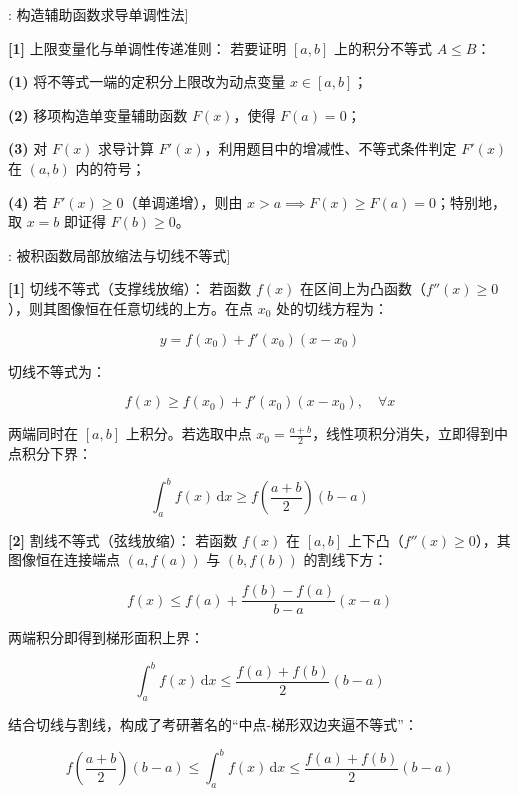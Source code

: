 \documentclass[11pt,a4paper,UTF8]{ctexart}
\begin{document}
\begin{thmbox}[方法[7]: 构造辅助函数求导单调性法]

\textbf{[1]} 上限变量化与单调性传递准则：
若要证明 $[a, b]$ 上的积分不等式 $A \leqslant B$：

\textbf{(1)}  将不等式一端的定积分上限改为动点变量 $x \in [a, b]$；

\textbf{(2)}  移项构造单变量辅助函数 $F(x)$，使得 $F(a) = 0$；

\textbf{(3)}  对 $F(x)$ 求导计算 $F'(x)$，利用题目中的增减性、不等式条件判定 $F'(x)$ 在 $(a, b)$ 内的符号；

\textbf{(4)}  若 $F'(x) \geqslant 0$（单调递增），则由 $x > a \implies F(x) \geqslant F(a) = 0$；特别地，取 $x = b$ 即证得 $F(b) \geqslant 0$。

\end{thmbox}
\begin{thmbox}[方法[8]: 被积函数局部放缩法与切线不等式]

\textbf{[1]} 切线不等式（支撑线放缩）：
若函数 $f(x)$ 在区间上为凸函数（$f''(x) \geqslant 0$），则其图像恒在任意切线的上方。在点 $x_0$ 处的切线方程为：


\begin{equation*}
y = f(x_0) + f'(x_0)(x-x_0)
\end{equation*}


切线不等式为：


\begin{equation*}
f(x) \geqslant f(x_0) + f'(x_0)(x-x_0), \quad \forall x
\end{equation*}


两端同时在 $[a, b]$ 上积分。若选取中点 $x_0 = \frac{a+b}{2}$，线性项积分消失，立即得到中点积分下界：


\begin{equation*}
\int_a^b f(x)\,\mathrm{d}x \geqslant f\left(\frac{a+b}{2}\right)(b-a)
\end{equation*}


\textbf{[2]} 割线不等式（弦线放缩）：
若函数 $f(x)$ 在 $[a, b]$ 上下凸（$f''(x) \geqslant 0$），其图像恒在连接端点 $(a, f(a))$ 与 $(b, f(b))$ 的割线下方：


\begin{equation*}
f(x) \leqslant f(a) + \frac{f(b)-f(a)}{b-a}(x-a)
\end{equation*}


两端积分即得到梯形面积上界：


\begin{equation*}
\int_a^b f(x)\,\mathrm{d}x \leqslant \frac{f(a)+f(b)}{2}(b-a)
\end{equation*}


结合切线与割线，构成了考研著名的“中点-梯形双边夹逼不等式”：


\begin{equation*}
f\left(\frac{a+b}{2}\right)(b-a) \leqslant \int_a^b f(x)\,\mathrm{d}x \leqslant \frac{f(a)+f(b)}{2}(b-a)
\end{equation*}


\end{thmbox}
\end{document}
